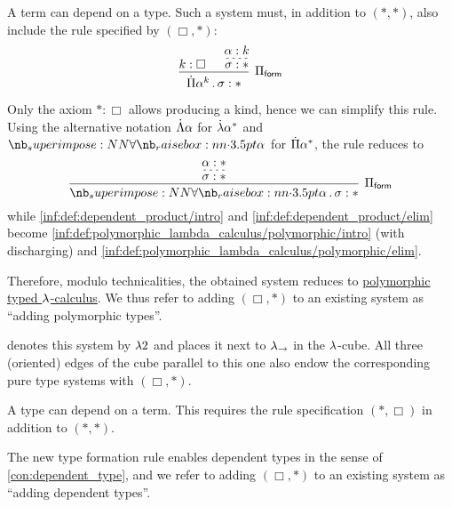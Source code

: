 \begin{definition}
\begin{thmenum}
     A term can depend on a type. Such a system must, in addition to \( (\ast, \ast) \), also include the rule specified by \( (\Box, \ast) \):
    \begin{equation*}
      \begin{prooftree}
        \hypo{ k: \Box }

        \hypo{ \alpha: k }
        \infer[dashed]1{ \sigma: \ast }

        \infer2[\ensuremath{ \Pi_{\logic{form}} }]{ \qprod {\alpha^k} \sigma: \ast }.
      \end{prooftree}
    \end{equation*}

    Only the axiom \( \ast: \Box \) allows producing a kind, hence we can simplify this rule. Using the alternative notation \( \dot{\Lambda} \alpha \) for \( \mathord{\dot{{\mathrm \lambda}}} {\alpha^\ast} \) and \( \synforall \alpha \) for \( \dot{\Pi} {\alpha^\ast} \), the rule reduces to
    \begin{equation*}
      \begin{prooftree}
        \hypo{ \alpha: \ast }
        \infer[dashed]1{ \sigma: \ast }

        \infer1[\ensuremath{ \Pi_{\logic{form}} }]{ \qpolytype \alpha \sigma: \ast },
      \end{prooftree}
    \end{equation*}
    while \ref{inf:def:dependent_product/intro} and \ref{inf:def:dependent_product/elim} become \ref{inf:def:polymorphic_lambda_calculus/polymorphic/intro} (with discharging) and \ref{inf:def:polymorphic_lambda_calculus/polymorphic/elim}.

    Therefore, modulo technicalities, the obtained system reduces to \hyperref[def:polymorphic_typed_lambda_calculus]{polymorphic typed \( {\mathrm \lambda} \)-calculus}. We thus refer to adding \( (\Box, \ast) \) to an existing system as \enquote{adding polymorphic types}.

     denotes this system by \( {\mathrm \lambda} 2 \) and places it next to \( {\mathrm \lambda}_{\rightarrow} \) in the \( {\mathrm \lambda} \)-cube. All three (oriented) edges of the cube parallel to this one also endow the corresponding pure type systems with \( (\Box, \ast) \).

     A type can depend on a term. This requires the rule specification \( (\ast, \Box) \) in addition to \( (\ast, \ast) \).

    The new type formation rule enables dependent types in the sense of \cref{con:dependent_type}, and we refer to adding \( (\Box, \ast) \) to an existing system as \enquote{adding dependent types}.


\end{thmenum}
\end{definition}
